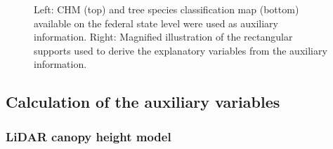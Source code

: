 \begin{figure}[H]
	\centering
	\caption{Left: CHM (top) and tree species classification map (bottom) available on the federal state level were used as auxiliary information. Right: Magnified illustration of the rectangular supports used to derive the explanatory variables from the auxiliary information.}
	\label{fig:Auxvars}
\end{figure}




\subsection{Calculation of the auxiliary variables}
\label{sec:expvarcalc}

\subsubsection{LiDAR canopy height model}

